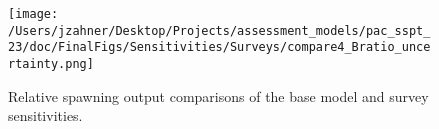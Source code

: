 \documentclass[11pt,
  letterpaper,
]{article}
\begin{document}
\begin{figure}
{\centering
\texttt{[image: /Users/jzahner/Desktop/Projects/assessment\_models/pac\_sspt\_23/doc/FinalFigs/Sensitivities/Surveys/compare4\_Bratio\_uncertainty.png]}
}
\caption{Relative spawning output comparisons of the base model and survey sensitivities.\label{fig:surv_sensitiv_mngmt}}
\end{figure}
\end{document}
